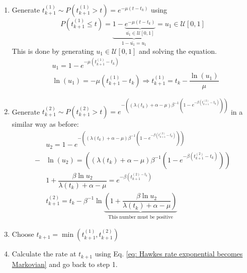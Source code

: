 \begin{enumerate}
    \item Generate $t_{k+1}^{(1)}\sim P \left( t_{k+1}^{(1)}>t \right) = e^{-\mu\left( t-t_k \right)}$ using 
    $$P\left( t_{k+1}^{(1)}\leq t \right) = \underbrace{1- \underbrace{e^{-\mu(t-t_k)}}_{\bar{u_1}\in\mathcal{U}[0,1]}}_{1-\bar{u_1}=u_1}=u_1 \in \mathcal{U}[0,1]$$
    This is done by generating $u_1\in\mathcal{U}[0,1]$ and solving the equation.
    \begin{equation}
        \begin{split}
        &u_1=1-e^{-\mu\left( t_{k+1}^{(1)}-t_k \right)}\\
        &\ln(u_1)=-\mu\left( t_{k+1}^{(1)}-t_k  \right)\Rightarrow t_{k+1}^{(1)}=t_k-\dfrac{\ln(u_1)}{\mu}            
        \end{split}
        \label{eq: inter-event time 1}
    \end{equation}
    \item Generate $t_{k+1}^{(2)}\sim P\left( t_{k+1}^{(2)}>t \right)=e^{-\left( \left( \lambda(t_k)+\alpha-\mu \right)\beta^{-1}\left( 1-e^{-\beta\left( t_{k+1}^{(2)}-t_k\right)}\right)\right)}$
    in a similar way as before:
    \begin{equation}
        \begin{split}
            &u_2=1-e^{-\left( \left( \lambda(t_k)+\alpha-\mu \right)\beta^{-1}\left( 1-e^{-\beta\left( t_{k+1}^{(2)}-t_k\right)}\right)\right)}\\
            -&\ln(u_2)=\left( \left( \lambda(t_k)+\alpha-\mu \right)\beta^{-1}\left( 1-e^{-\beta\left( t_{k+1}^{(2)}-t_k\right)}\right)\right)\\ 
            & 1+\dfrac{\beta\ln u_2}{\lambda(t_k)+\alpha-\mu}=e^{-\beta\left( t_{k+1}^{(2)-t_k}\right)}\\
            &t_{k+1}^{(2)}=t_k-\beta^{-1}\ln\underbrace{\left( 1+\dfrac{\beta\ln u_2}{\lambda(t_k)+\alpha-\mu} \right)}_{\text{This number must be positive}}   
        \end{split}
        \label{eq: inter-event time 2}
    \end{equation}   
    \item Choose $t_{k+1}=\min\left( t_{k+1}^{(1)},t_{k+1}^{(2)} \right)$
    \item Calculate the rate at $t_{k+1}$ using Eq. \ref{eq: Hawkes rate exponential becomes Markovian} and go back to step 1.
\end{enumerate}

